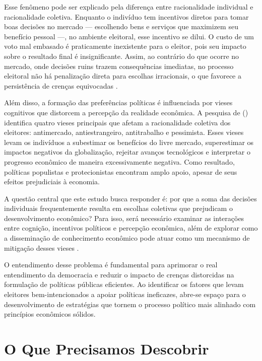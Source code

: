Esse fenômeno pode ser explicado pela diferença entre racionalidade individual e racionalidade coletiva. Enquanto o indivíduo tem incentivos diretos para tomar boas decisões no mercado — escolhendo bens e serviços que maximizem seu benefício pessoal —, no ambiente eleitoral, esse incentivo se dilui. O custo de um voto mal embasado é praticamente inexistente para o eleitor, pois seu impacto sobre o resultado final é insignificante. Assim, ao contrário do que ocorre no mercado, onde decisões ruins trazem consequências imediatas, no processo eleitoral não há penalização direta para escolhas irracionais, o que favorece a persistência de crenças equivocadas \cite{bastiat1859sofismas,downs1957economic,The_Myth_of_the_Rational_Voter}.

Além disso, a formação das preferências políticas é influenciada por vieses cognitivos que distorcem a percepção da realidade econômica. A pesquisa de  (\citeyear{The_Myth_of_the_Rational_Voter}) identifica quatro vieses principais que afetam a racionalidade coletiva dos eleitores: antimercado, antiestrangeiro, antitrabalho e pessimista. Esses vieses levam os indivíduos a subestimar os benefícios do livre mercado, superestimar os impactos negativos da globalização, rejeitar avanços tecnológicos e interpretar o progresso econômico de maneira excessivamente negativa. Como resultado, políticas populistas e protecionistas encontram amplo apoio, apesar de seus efeitos prejudiciais à economia.

A questão central que este estudo busca responder é: por que a soma das decisões individuais frequentemente resulta em escolhas coletivas que prejudicam o desenvolvimento econômico? Para isso, será necessário examinar as interações entre cognição, incentivos políticos e percepção econômica, além de explorar como a disseminação de conhecimento econômico pode atuar como um mecanismo de mitigação desses vieses \cite{positive_economics_friedman,Judgment_under_Uncertainty,kahneman2011thinking}.

O entendimento desse problema é fundamental para aprimorar o real entendimento da democracia e reduzir o impacto de crenças distorcidas na formulação de políticas públicas eficientes. Ao identificar os fatores que levam eleitores bem-intencionados a apoiar políticas ineficazes, abre-se espaço para o desenvolvimento de estratégias que tornem o processo político mais alinhado com princípios econômicos sólidos.

\section{O Que Precisamos Descobrir} %

